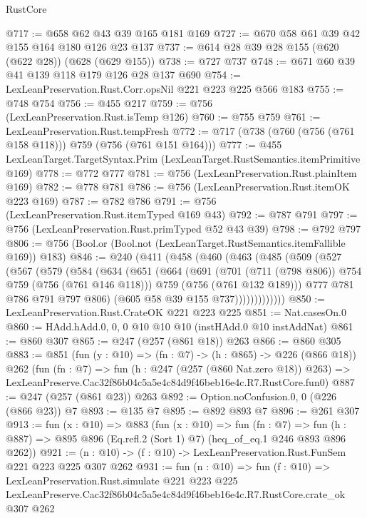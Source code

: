 \begin{lexlean}{RustCore}
\begin{coremodule}
@717 := @658 @62 @43 @39 @165 @181 @169
@727 := @670 @58 @61 @39 @42 @155 @164 @180 @126 @23 @137
@737 := @614 @28 @39 @28 @155 (@620 (@622 @28)) (@628 (@629 @155))
@738 := @727 @737
@748 := @671 @60 @39 @41 @139 @118 @179 @126 @28 @137 @690
@754 := LexLeanPreservation.Rust.Corr.opsNil @221 @223 @225 @566 @183
@755 := @748 @754
@756 := @455 @217
@759 := @756 (LexLeanPreservation.Rust.isTemp @126)
@760 := @755 @759
@761 := LexLeanPreservation.Rust.tempFresh
@772 := @717 (@738 (@760 (@756 (@761 @158 @118))) @759 (@756 (@761 @151 @164)))
@777 := @455 LexLeanTarget.TargetSyntax.Prim (LexLeanTarget.RustSemantics.itemPrimitive @169)
@778 := @772 @777
@781 := @756 (LexLeanPreservation.Rust.plainItem @169)
@782 := @778 @781
@786 := @756 (LexLeanPreservation.Rust.itemOK @223 @169)
@787 := @782 @786
@791 := @756 (LexLeanPreservation.Rust.itemTyped @169 @43)
@792 := @787 @791
@797 := @756 (LexLeanPreservation.Rust.primTyped @52 @43 @39)
@798 := @792 @797
@806 := @756 (Bool.or (Bool.not (LexLeanTarget.RustSemantics.itemFallible @169)) @183)
@846 := @240
    (@411
      (@458
        (@460
          (@463
            (@485
              (@509
                (@527
                  (@567
                    (@579
                      (@584
                        (@634
                          (@651
                            (@664
                              (@691
                                (@701 (@711 (@798 @806)) @754 @759 (@756 (@761 @146 @118)))
                                @759
                                (@756 (@761 @132 @189)))
                              @777
                              @781
                              @786
                              @791
                              @797
                              @806)
                            (@605 @58 @39 @155 @737)))))))))))))
@850 := LexLeanPreservation.Rust.CrateOK @221 @223 @225
@851 := Nat.casesOn.{0}
@860 := HAdd.hAdd.{0, 0, 0} @10 @10 @10 (instHAdd.{0} @10 instAddNat)
@861 := @860 @307
@865 := @247 (@257 (@861 @18)) @263
@866 := @860 @305
@883 := @851
    (fun (y : @10) => (fn : @7) -> (h : @865) -> @226 (@866 @18))
    @262
    (fun (fn : @7) =>
    fun (h : @247 (@257 (@860 Nat.zero @18)) @263) =>
    LexLeanPreserve.Cac32f86b04c5a5e4c84d9f46beb16e4c.R7.RustCore.fun0)
@887 := @247 (@257 (@861 @23)) @263
@892 := Option.noConfusion.{0, 0} (@226 (@866 @23)) @7
@893 := @135 @7
@895 := @892 @893 @7
@896 := @261 @307
@913 := fun (x : @10) =>
  @883
    (fun (x : @10) =>
    fun (fn : @7) =>
    fun (h : @887) => @895 @896 (Eq.refl.{2} (Sort 1) @7) (heq_of_eq.{1} @246 @893 @896 @262))
@921 := (n : @10) -> (f : @10) -> LexLeanPreservation.Rust.FunSem @221 @223 @225 @307 @262
@931 := fun (n : @10) =>
  fun (f : @10) =>
  LexLeanPreservation.Rust.simulate
    @221
    @223
    @225
    LexLeanPreserve.Cac32f86b04c5a5e4c84d9f46beb16e4c.R7.RustCore.crate_ok
    @307
    @262
\end{coremodule}
\end{lexlean}
